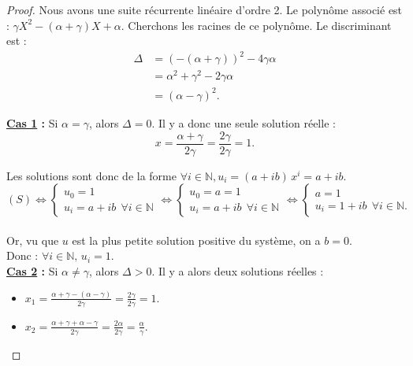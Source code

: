 \documentclass[12pt,a4paper]{report}
\theoremstyle{remark}
\begin{document}
\begin{proof}
\vspace{0.5cm}

Nous avons une suite récurrente linéaire d'ordre 2. Le polynôme associé est  : $\gamma X^2 -(\alpha+\gamma)X+\alpha$. Cherchons les racines de ce polynôme. Le discriminant est :
\begin{align*}
\Delta &= (-(\alpha+\gamma))^2 - 4\gamma \alpha \\
&=\alpha^2 + \gamma^2-2\gamma\alpha \\
&= (\alpha-\gamma)^2.
\end{align*}

\textbf{\underline{Cas 1} :} Si $\alpha = \gamma$, alors $\Delta = 0$. Il y a donc une seule solution réelle : 
$$x = \frac{\alpha + \gamma}{2 \gamma}=  \frac{2\gamma}{2\gamma} = 1.$$

Les solutions sont donc de la forme $\forall i \in \mathbb{N}, u_i = (a+ib) \, x^i = a+ib$.\\
$$(S) \iff \left\{
\begin{array}{ll}
        u_0=1\\
        u_i=a+ib \ \ \forall i \in \mathbb{N}
    \end{array}
\right. 
\iff \left\{
\begin{array}{ll}
        u_0=a=1\\
        u_i=a+ib \ \ \forall i \in \mathbb{N}
    \end{array}
    \right. 
\iff \left\{
\begin{array}{ll}
        a = 1\\
        u_i=1+ib \ \ \forall i \in \mathbb{N}.
    \end{array}
    \right.$$
\\
Or, vu que $u$ est la plus petite solution positive du système, on a $b=0$.\\
Donc : $\forall i \in \mathbb{N}, \, u_i=1.$
\vspace{0.7cm}\\
\textbf{\underline{Cas 2} :} Si $\alpha \neq \gamma$, alors $\Delta > 0$. Il y a alors deux solutions réelles : 
\\
\begin{itemize}
\item $x_1 = \frac{\alpha + \gamma - (\alpha-\gamma)}{2\gamma}=\frac{2\gamma}{2\gamma}=1.$
\item $x_2= \frac{\alpha + \gamma + \alpha-\gamma}{2\gamma}=\frac{2\alpha}{2\gamma}=\frac{\alpha}{\gamma}.$
\end{itemize}
\vspace{0.5cm}

\end{proof}
\end{document}

